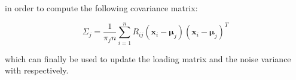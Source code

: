 \documentclass{article}
\newcommand{\E}{\mathbb{E}}
\begin{document}
\noindent in order to compute the following covariance matrix:

\begin{equation}
    \label{eq:mppca_EM_cov}
    \Sigma_j = \frac{1}{\pi_jn}\sum_{i=1}^n R_{ij}\left(\mathbf{x}_i - \boldsymbol{\mu}_j\right)\left(\mathbf{x}_i - \boldsymbol{\mu}_j\right)^T
\end{equation}

\noindent which can finally be used to update the loading matrix and the noise variance with  respectively.



    

\end{document}

